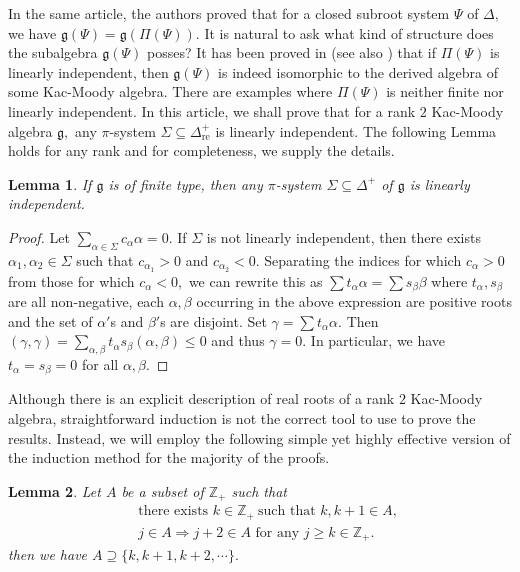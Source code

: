 \documentclass[12pt,reqno]{amsart}
\theoremstyle{plain}
\newtheorem{lem}{Lemma}
\theoremstyle{definition}
\theoremstyle{remark}
\newcommand{\lie}[1]{\mathfrak{#1}}
\newcommand\bz{\mathbb Z}
\begin{document}
    In the same article, the authors proved that for a closed subroot system $\Psi$ of $\Delta,$ we have $\lie g(\Psi)=\lie g(\Pi(\Psi)).$ It is natural to ask what kind of structure does the subalgebra $\lie g(\Psi)$ posses? It has been proved in \cite{naito1992regular} (see also \cite{carbone2021varvec}) that if $\Pi(\Psi)$ is linearly independent, then $\lie g(\Psi)$ is indeed isomorphic to the derived algebra of some Kac-Moody algebra. There are examples where $\Pi(\Psi)$ is neither finite nor linearly independent. In this article, we shall prove that for a rank $2$ Kac-Moody algebra $\lie g,$ any $\pi$-system $\Sigma\subseteq \Delta^+_{\mathrm{re}}$ is linearly independent. The following Lemma holds for any rank and for completeness, we supply the details. 
\begin{lem}\label{finpisystem}
    If $\lie g$ is of finite type, then any $\pi$-system $\Sigma\subseteq \Delta^+$ of $\lie g$ is linearly independent.
\end{lem}
\begin{proof}
    Let $\sum_{\alpha\in \Sigma} c_\alpha \alpha=0.$ If $\Sigma$ is not linearly independent, then there exists $\alpha_1,\alpha_2\in \Sigma$ such that $c_{\alpha_1}>0$ and $c_{\alpha_2}<0.$ Separating the indices for which $c_\alpha>0$ from those for which $c_\alpha<0,$ we can rewrite this as $\sum t_\alpha \alpha=\sum s_\beta \beta$ where $t_\alpha,s_\beta$ are all non-negative, each  $\alpha,\beta$ occurring in the above expression are positive roots and the set of $\alpha'$s and $\beta'$s are disjoint. Set $\gamma=\sum t_\alpha \alpha.$ Then $(\gamma,\gamma)=\sum_{\alpha,\beta} t_\alpha s_\beta(\alpha,\beta)\le 0$ and thus $\gamma=0.$ In particular, we have $t_\alpha=s_\beta=0$ for all $\alpha,\beta.$
\end{proof}

Although there is an explicit description of real roots of a rank $2$ Kac-Moody algebra, straightforward induction is not the correct tool to use to prove the results. Instead, we will employ the following simple yet highly effective version of the induction method for the majority of the proofs.
\begin{lem}\label{lemstar}
    Let $A$ be a subset of $\bz_+$ such that 
\begin{equation}\label{propstar}
\begin{split}
    &\ \ \text{there exists }k\in \bz_+\ \text{such that }k,k+1\in A,\\
    &\ \ j\in A\Longrightarrow j+2\in A\text{ for any }j\geq k\in \bz_+.
\end{split}\tag{$\star$}
\end{equation}
then we have $A\supseteq \{k,k+1,k+2,\cdots\}.$
\end{lem}
\end{document}

